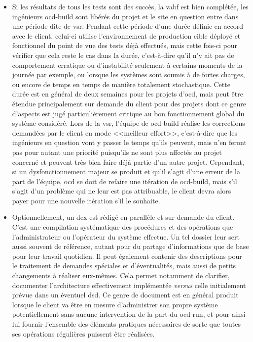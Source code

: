 \documentclass[12pt, oneside, a4paper, titlepage]{report}
\begin{document}
\begin{itemize}
    \item Si les résultats de tous les tests sont des succès, la \gls{vabf} est
        bien complétée, les ingénieurs \gls{ocd-build} sont libérés du projet et
        le site en question entre dans une période dite de \gls{vsr}. Pendant
        cette période d'une durée définie en accord avec le client, celui-ci
        utilise l'environnement de production cible déployé et fonctionnel du
        point de vue des tests déjà effectués, mais cette fois-ci pour vérifier
        que cela reste le cas dans la durée, c'est-à-dire qu'il n'y ait pas de
        comportement erratique ou d'instabilité seulement à certains moments de
        la journée par exemple, ou lorsque les systèmes sont soumis à de fortes
        charges, ou encore de temps en temps de manière totalement stochastique.
        Cette durée est en général de deux semaines pour les projets
        d'\acrlong{ocd}, mais peut être étendue principalement sur demande du
        client pour des projets dont ce genre d'aspects est jugé
        particulièrement critique au bon fonctionnement global du système
        considéré. Lors de la \gls{vsr}, l'équipe de \gls{ocd-build} réalise les
        corrections demandées par le client en mode <<meilleur effort>>,
        c'est-à-dire que les ingénieurs en question vont y passer le temps
        qu'ils peuvent, mais n'en feront pas pour autant une priorité puisqu'ils
        ne sont plus affectés au projet concerné et peuvent très bien faire déjà
        partie d'un autre projet. Cependant, si un dysfonctionnement majeur se
        produit et qu'il s'agit d'une erreur de la part de l'équipe, \gls{ocd}
        se doit de refaire une itération de \gls{ocd-build}, mais s'il s'agit
        d'un problème qui ne leur est pas attribuable, le client devra alors
        payer pour une nouvelle itération s'il le souhaite.

    \item Optionnellement, un \gls{dex} est rédigé en parallèle et sur demande
        du client. C'est une compilation systématique des procédures et des
        opérations que l'administrateur ou l'opérateur du système effectue. Un
        tel dossier leur sert aussi souvent de référence, autant pour du partage
        d'informations que de base pour leur travail quotidien. Il peut
        également contenir des descriptions pour le traitement de demandes
        spéciales et d'éventualités, mais aussi de petits changements à réaliser
        eux-mêmes. Cela permet notamment de clarifier, documenter l'architecture
        effectivement implémentée \textit{versus} celle initialement prévue dans
        un éventuel \gls{dsd}. Ce genre de document est en général produit
        lorsque le client va être en mesure d'administrer son propre système
        potentiellement sans aucune intervention de la part du \gls{ocd-run}, et
        pour ainsi lui fournir l'ensemble des éléments pratiques nécessaires de
        sorte que toutes ses opérations régulières puissent être réalisées.


\end{itemize}
\end{document}
